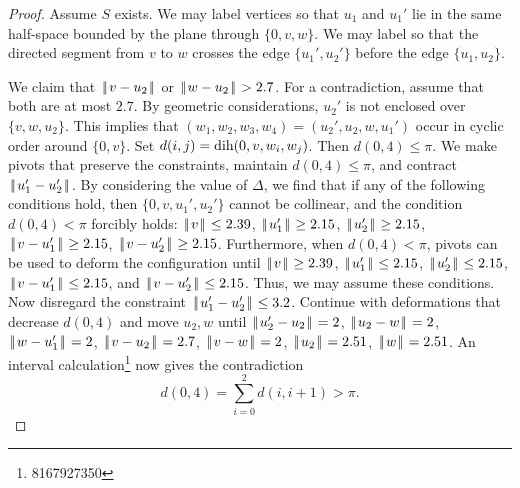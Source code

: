 \documentclass[11pt]{amsart}
\def\op#1{{\text{#1}}}
\def\dih{\op{dih}}
\def\text{\hbox}
\def\|{{\hskip0.1em|\hskip-0.15em|\hskip0.1em}}
\begin{document}
\begin{proof}
Assume $S$ exists.  We may label vertices so that $u_1$ and $u_1'$ lie in the same half-space bounded by
the plane through $\{0,v,w\}$.   We may label so that the directed
segment from $v$ to $w$ crosses the edge $\{u_1',u_2'\}$
before the edge $\{u_1,u_2\}$.

We claim that $\|v-u_2\|$ or $\|w-u_2\| > 2.7$.  For a contradiction, assume that both
are at most $2.7$.  By geometric considerations, $u_2'$ is not enclosed over $\{v,w,u_2\}$.
This implies that $(w_1,w_2,w_3,w_4)=(u_2',u_2,w,u_1')$ occur in cyclic order around $\{0,v\}$.
Set $d(i,j) = \op{dih}(0,v,w_i,w_j)$.  Then $d(0,4)\le \pi$.
We make pivots that preserve the constraints, maintain $d(0,4)\le \pi$, and contract $\|u_1'-u_2'\|$.
By considering the value of $\Delta$, we find that if any of the following conditions hold, then $\{0,v,u_1',u_2'\}$ cannot be collinear, and the condition
$d(0,4)<\pi$ forcibly holds: $\|v\|\le 2.39$, $\|u_1'\|\ge 2.15$, $\|u_2'\|\ge 2.15$, $\|v-u_1'\|\ge 2.15$, $\|v-u_2'\|\ge 2.15$.
Furthermore, when $d(0,4)<\pi$, pivots can be used to deform the configuration until
$\|v\|\ge 2.39$, $\|u_1'\|\le 2.15$, $\|u_2'\|\le 2.15$, $\|v-u_1'\|\le 2.15$, and $\|v-u_2'\|\le 2.15$.  Thus, 
we may assume these conditions.  Now disregard the constraint $\|u_1'-u_2'\|\le 3.2$.  Continue with deformations
that decrease $d(0,4)$ and move $u_2,w$ until $\|u_2'-u_2\|=2$, $\|u_2-w\|=2$, $\|w-u_1'\|=2$, $\|v-u_2\|=2.7$, $\|v-w\|=2$, $\|u_2\|=2.51$, $\|w\|=2.51$.
An interval calculation\footnote{8167927350} now gives the contradiction
  $$d(0,4) = \sum_{i=0}^2d(i,i+1) > \pi.$$
%
%


\end{proof}
\end{document}
